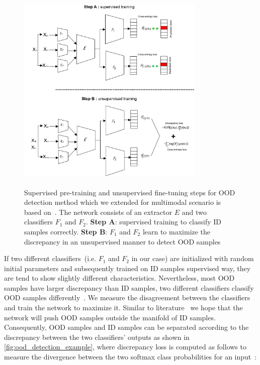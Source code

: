 \begin{figure}[htp!]
    \centering
    \includegraphics[width=0.8\textwidth,height=100mm]{images/OOD_1.png}
    \caption[Supervised pre-training and unsupervised fine-tuning steps for OOD detection.]{Supervised pre-training and unsupervised fine-tuning steps for OOD detection method which we extended for multimodal scenario is based on~\cite{yu2019unsupervised}. The network consists of an extractor $E$ and two classifiers $F_{1}$ and $F_{2}$. \textbf{Step A}: supervised training to classify ID samples correctly. \textbf{Step B}: $F_{1}$ and $F_{2}$ learn to maximize the discrepancy in an unsupervised manner to detect OOD samples}
    \label{fig:ood_network}
    \vspace{-2mm}
\end{figure}

\hspace*{3.5mm} If two different classifiers~(i.e. $F_{1}$ and $F_{2}$ in our case) are initialized with random initial parameters and subsequently trained on ID samples supervised way, they are tend to show slightly different characteristics. Nevertheless, most OOD samples have larger discrepancy than ID samples, two different classifiers classify OOD samples differently~\cite{OOD19}. 
We measure the disagreement between the classifiers and train the network to maximize it. Similar to literature~\cite{OOD19} we hope that the network will push OOD samples outside the manifold of ID samples. Consequently, OOD samples and ID samples can be separated according to the discrepancy between the two classifiers’ outputs as shown in \cref{fig:ood_detection_example}, where discrepancy loss is computed as follows to measure the divergence between the two softmax class probabilities for an input~\cite{OOD19}: 


